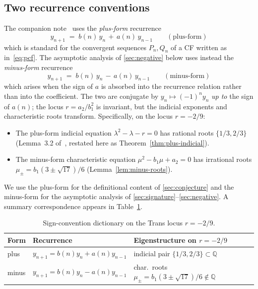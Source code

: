 \documentclass[11pt]{amsart}
\theoremstyle{definition}
\theoremstyle{remark}
\newcommand{\Q}{\mathbb{Q}}
\begin{document}
\subsection{Two recurrence conventions}\label{sec:conventions}

The companion note~\cite{TRINote} uses the
\emph{plus-form} recurrence
\begin{equation}\label{eq:plus}
  y_{n+1} \;=\; b(n)\,y_n \,+\, a(n)\,y_{n-1}\qquad(\text{plus-form})
\end{equation}
which is standard for the convergent sequences $P_n,Q_n$ of a CF
written as in~\eqref{eq:pcf}.  The asymptotic analysis of
\textsection\ref{sec:negative} below uses instead the
\emph{minus-form} recurrence
\begin{equation}\label{eq:minus}
  y_{n+1} \;=\; b(n)\,y_n \,-\, a(n)\,y_{n-1}\qquad(\text{minus-form})
\end{equation}
which arises when the sign of $a$ is absorbed into the recurrence
relation rather than into the coefficient.  The two are conjugate by
$y_n \mapsto (-1)^n y_n$ \emph{up to} the sign of $a(n)$; the locus
$r = a_2/b_1^2$ is invariant, but the indicial exponents and
characteristic roots transform.  Specifically, on the locus
$r = -2/9$:
\begin{itemize}[leftmargin=1.4em]
\item The plus-form indicial equation
$\lambda^2 - \lambda - r = 0$ has rational roots $\{1/3,2/3\}$
(Lemma~3.2 of~\cite{TRINote}, restated here as
Theorem~\ref{thm:plus-indicial}).
\item The minus-form characteristic equation $\mu^2 - b_1\mu + a_2=0$
has irrational roots $\mu_\pm = b_1(3\pm\sqrt{17})/6$
(Lemma~\ref{lem:minus-roots}).
\end{itemize}
We use the plus-form for the definitional content of
\textsection\ref{sec:conjecture} and the minus-form for the
asymptotic analysis of \textsection\textsection\ref{sec:signature}--\ref{sec:negative}.
A summary correspondence appears in Table~\ref{tab:conventions}.

\begin{table}[t]
\centering
\caption{Sign-convention dictionary on the Trans locus $r=-2/9$.}
\label{tab:conventions}
\begin{tabular}{lll}
\toprule
Form & Recurrence & Eigenstructure on $r=-2/9$ \\
\midrule
plus & $y_{n+1} = b(n)y_n + a(n)y_{n-1}$
& indicial pair $\{1/3,2/3\}\subset\Q$ \\
minus & $y_{n+1} = b(n)y_n - a(n)y_{n-1}$
& char.\ roots $\mu_\pm = b_1(3\pm\sqrt{17})/6\notin\Q$ \\
\bottomrule
\end{tabular}
\end{table}
\end{document}
